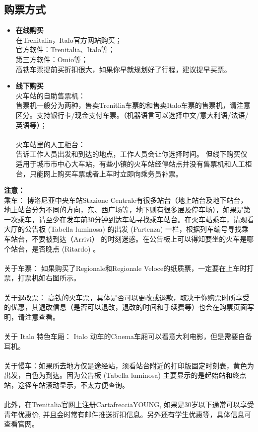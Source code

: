 \subsection{购票方式}
\begin{itemize}
\item  \textbf{在线购买}\\
在Trenitalia，Italo官方网站购买；\\
官方软件：Trenitalia、Italo等；\\
第三方软件：Omio等；\\
高铁车票提前买折扣很大，如果你早就规划好了行程，建议提早买票。\\
\item  \textbf{线下购买}\\
火车站的自助售票机：\\
售票机一般分为两种，售卖Trenitlia车票的和售卖Italo车票的售票机，请注意区分。支持银行卡/现金支付车票。（机器语言可以选择中文/意大利语/法语/英语等）；\\
\\
火车站里的人工柜台：\\
告诉工作人员出发和到达的地点，工作人员会让你选择时间。
但线下购买仅适用于城市市中心大车站，有些小镇的火车站经停站点并没有售票机和人工柜台，只能网上购买车票或者上车时立即向乘务员补票。
\end{itemize}
\textbf{注意：}\\
乘车：
博洛尼亚中央车站Stazione Centrale有很多站台（地上站台及地下站台，地上站台分为不同的方向，东、西广场等，地下则有很多层及停车场），如果是第一次乘车，请至少在发车前30分钟到达车站寻找乘车站台。在火车站乘车，请观看大厅的公告板 (Tabella luminosa) 的出发 (Partenza) 一栏，根据列车编号寻找乘车站台，不要被到达（Arrivi） 的时刻迷惑。在公告板上可以得知要坐的火车是哪个站台，是否晚点 (Ritardo) 。\\
\\
关于车票：
如果购买了Regionale和Regionale Veloce的纸质票，一定要在上车时打票，打票机如右图所示。\\
\\
关于退改票：
高铁的火车票，具体是否可以更改或退款，取决于你购票时所享受的优惠，其退改信息（是否可以退改，退改的时间和手续费等）也会在购票页面写明，请注意查看。\\
\\
关于 Italo 特色车厢：
Italo 动车的Cinema车厢可以看意大利电影，但是需要自备耳机。\\
\\
关于慢车：如果所去地方仅是途经站，须看站台附近的打印版固定时刻表，黄色为出发，白色为到达。因为公告板 (Tabella luminosa) 主要显示的是起始站和终点站，途径车站滚动显示，不太方便查询。 \\
\\
此外，在Trenitalia官网上注册CartafrecciaYOUNG, 如果是30岁以下通常可以享受青年优惠价, 并且会时常有邮件推送折扣信息。另外还有学生优惠等，具体信息可查看官网。\\



